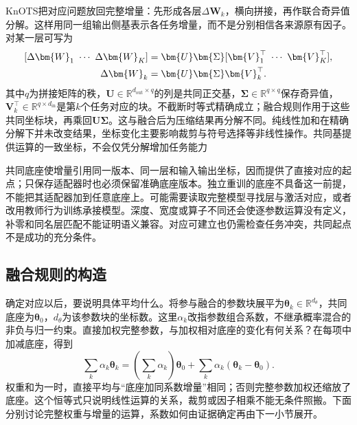 KnOTS把对应问题放回完整增量：先形成各层$\Delta\bm{W}_k$，横向拼接，再作联合奇异值分解。这样用同一组输出侧基表示各任务增量，而不是分别相信各来源原有因子。对某一层可写为
\begin{equation}
  \begin{aligned}
    \relax[\Delta\bm{W}_1\ \cdots\ \Delta\bm{W}_K]
      &=\bm{U}\bm{\Sigma}[\bm{V}_1^\top\ \cdots\ \bm{V}_K^\top],\\
    \Delta\bm{W}_k&=\bm{U}\bm{\Sigma}\bm{V}_k^\top.
  \end{aligned}
  \label{eq:ket-integration-knots}
\end{equation}
其中$q$为拼接矩阵的秩，$\bm{U}\in\mathbb{R}^{d_{\mathrm{out}}\times q}$的列是共同正交基，$\bm{\Sigma}\in\mathbb{R}^{q\times q}$保存奇异值，$\bm{V}_k^\top\in\mathbb{R}^{q\times d_{\mathrm{in}}}$是第$k$个任务对应的块。不截断时等式精确成立；融合规则作用于这些共同坐标块，再乘回$\bm{U}\bm{\Sigma}$。这与融合后为压缩结果再分解不同。纯线性加和在精确分解下并未改变结果，坐标变化主要影响裁剪与符号选择等非线性操作。共同基提供运算的一致坐标，不会仅凭分解增加任务能力

共同底座使增量引用同一版本、同一层和输入输出坐标，因而提供了直接对应的起点；只保存适配器时也必须保留准确底座版本。独立重训的底座不具备这一前提，不能把其适配器加到任意底座上。可能需要读取完整模型寻找层与激活对应，或者改用教师行为训练承接模型。深度、宽度或算子不同还会使逐参数运算没有定义，补零和同名层匹配不能证明语义兼容。对应可建立也仍需检查任务冲突，共同起点不是成功的充分条件。

\subsection{融合规则的构造}
\label{sec:ket-integration-merging-rule}

确定对应以后，要说明具体平均什么。将参与融合的参数块展平为$\bm{\theta}_k\in\mathbb{R}^{d_\theta}$，共同底座为$\bm{\theta}_0$，$d_\theta$为该参数块的坐标数。这里$\alpha_k$改指参数组合系数，不继承概率混合的非负与归一约束。直接加权完整参数，与加权相对底座的变化有何关系？在每项中加减底座，得到
\begin{equation}
  \sum_k\alpha_k\bm{\theta}_k
  =\left(\sum_k\alpha_k\right)\bm{\theta}_0+
    \sum_k\alpha_k(\bm{\theta}_k-\bm{\theta}_0).
  \label{eq:ket-integration-rule-equivalence}
\end{equation}
权重和为一时，直接平均与“底座加同系数增量”相同；否则完整参数加权还缩放了底座。这个恒等式只说明线性运算的关系，裁剪或因子相乘不能无条件照搬。下面分别讨论完整权重与增量的运算，系数如何由证据确定再由下一小节展开。

